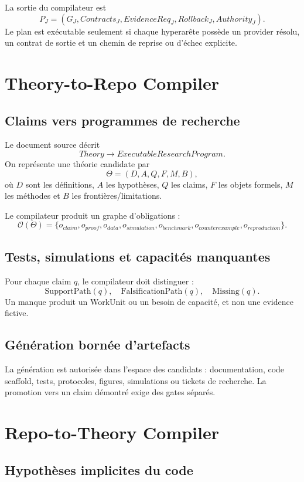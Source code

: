 La sortie du compilateur est
\[
P_J=(G_J,Contracts_J,EvidenceReq_J,Rollback_J,Authority_J).
\]
Le plan est exécutable seulement si chaque hyperarête possède un provider résolu, un contrat de sortie et un chemin de reprise ou d'échec explicite.

\chapter{Theory-to-Repo Compiler}

\section{Claims vers programmes de recherche}

Le document source décrit
\[
\boxed{Theory\rightarrow ExecutableResearchProgram}.
\]
On représente une théorie candidate par
\[
\Theta=(D,A,Q,F,M,B),
\]
où $D$ sont les définitions, $A$ les hypothèses, $Q$ les claims, $F$ les objets formels, $M$ les méthodes et $B$ les frontières/limitations.

Le compilateur produit un graphe d'obligations :
\[
\mathcal O(\Theta)=\{o_{claim},o_{proof},o_{data},o_{simulation},o_{benchmark},o_{counterexample},o_{reproduction}\}.
\]

\section{Tests, simulations et capacités manquantes}

Pour chaque claim $q$, le compilateur doit distinguer :
\[
\mathrm{SupportPath}(q),\quad \mathrm{FalsificationPath}(q),\quad \mathrm{Missing}(q).
\]
Un manque produit un WorkUnit ou un besoin de capacité, et non une evidence fictive.

\section{Génération bornée d'artefacts}

La génération est autorisée dans l'espace des candidats : documentation, code scaffold, tests, protocoles, figures, simulations ou tickets de recherche. La promotion vers un claim démontré exige des gates séparés.

\chapter{Repo-to-Theory Compiler}

\section{Hypothèses implicites du code}

